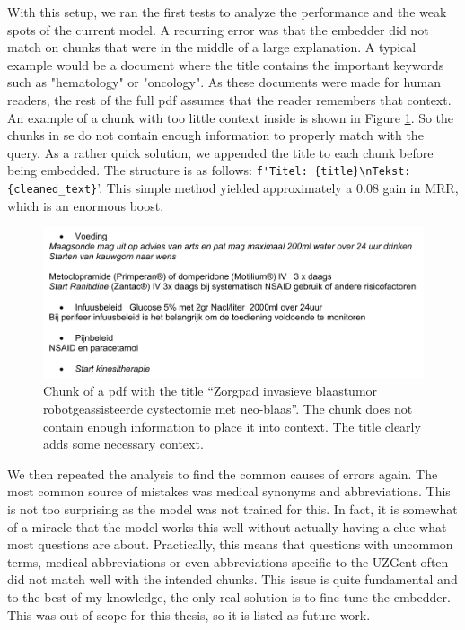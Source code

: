 With this setup, we ran the first tests to analyze the performance and the weak spots of the current model. A recurring error was that the embedder did not match on chunks that were in the middle of a large explanation. A typical example would be a document where the title contains the important keywords such as "hematology" or "oncology". As these documents were made for human readers, the rest of the full pdf assumes that the reader remembers that context. An example of a chunk with too little context inside is shown in Figure \ref{fig:out_of_context_zenya_doc}. So the chunks in se do not contain enough information to properly match with the query. As a rather quick solution, we appended the title to each chunk before being embedded. The structure is as follows: \verb|f'Titel: {title}\nTekst: {cleaned_text}|'. This simple method yielded approximately a 0.08 gain in MRR, which is an enormous boost.

\begin{figure}[h]
    \centerline{\includegraphics[width=1\linewidth]{fig/out_of_context_zenya_doc.png}}
    \caption{Chunk of a pdf with the title ``Zorgpad invasieve blaastumor robotgeassisteerde cystectomie met neo-blaas''. The chunk does not contain enough information to place it into context. The title clearly adds some necessary context.}
    \label{fig:out_of_context_zenya_doc}
\end{figure}

We then repeated the analysis to find the common causes of errors again. The most common source of mistakes was medical synonyms and abbreviations. This is not too surprising as the model was not trained for this. In fact, it is somewhat of a miracle that the model works this well without actually having a clue what most questions are about. Practically, this means that questions with uncommon terms, medical abbreviations or even abbreviations specific to the UZGent often did not match well with the intended chunks. This issue is quite fundamental and to the best of my knowledge, the only real solution is to fine-tune the embedder. This was out of scope for this thesis, so it is listed as future work.


